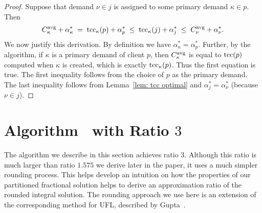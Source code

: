 \documentclass[11pt]{article}
\begin{document}
\begin{proof}
Suppose that demand $\nu\in j$ is assigned to some primary demand $\kappa\in p$.
Then
%
\begin{eqnarray*}
 C^{{\mbox{\scriptsize\rm avg}}}_{\kappa} + \alpha_{\kappa}^\ast \;=\; \textrm{tcc}_\kappa(p) + \alpha^\ast_p
 					\;\le\; \textrm{tcc}_\kappa(j) + \alpha^\ast_j   
					\;\le\; C^{{\mbox{\scriptsize\rm avg}}}_{\nu} + \alpha^\ast_\nu.
\end{eqnarray*}
%
We now justify this derivation. By definition we have
$\alpha_{\kappa}^\ast = \alpha^\ast_p$.  Further, by the
algorithm, if $\kappa$ is a primary demand of client $p$,
then $C^{{\mbox{\scriptsize\rm avg}}}_{\kappa}$ is equal to $\textrm{tcc}(p)$ computed when
$\kappa$ is created, which is exactly $\textrm{tcc}_\kappa(p)$. Thus
the first equation is true. The first inequality follows
from the choice of $p$ as the primary demand.  The last
inequality follows from Lemma~\ref{lem: tcc optimal} and
$\alpha^\ast_j = \alpha^\ast_\nu$ (because $\nu\in j$).
\end{proof}



\section{Algorithm~{\EGUP} with Ratio $3$}
\label{sec: 3-approximation}

The algorithm we describe in this section achieves ratio
$3$. Although this ratio is much larger than ratio $1.575$
we derive later in the paper, it uses a much simpler
rounding process. This helps develop an intuition on how the
properties of our partitioned fractional solution helps to
derive an approximation ratio of the rounded integral
solution. The rounding approach we use here is an extension
of the corresponding method for UFL, described by
Gupta~\cite{gupta08}.
\end{document}
